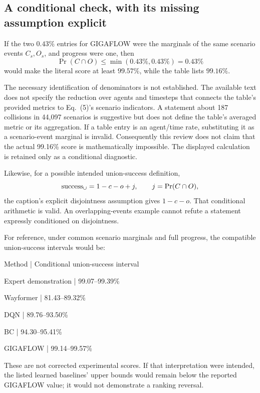 \documentclass[10pt]{article}
\begin{document}
\subsection*{A conditional check, with its missing assumption explicit}
If the two \(0.43\%\) entries for GIGAFLOW were the marginals of the same scenario events \(C_s,O_s\), and progress were one, then \[\Pr(C\cap O)\le\min(0.43\%,0.43\%)=0.43\%\] would make the literal score at least \(99.57\%\), while the table lists \(99.16\%\).\par
The necessary identification of denominators is not established. The available text does not specify the reduction over agents and timesteps that connects the table’s provided metrics to Eq. (5)’s scenario indicators. A statement about 187 collisions in 44,097 scenarios is suggestive but does not define the table’s averaged metric or its aggregation. If a table entry is an agent/time rate, substituting it as a scenario-event marginal is invalid. Consequently this review does not claim that the actual 99.16\% score is mathematically impossible. The displayed calculation is retained only as a conditional diagnostic.\par
Likewise, for a possible intended union-success definition, \[{\rm success}_{\cup}=1-c-o+j,\qquad j=\Pr(C\cap O),\] the caption’s explicit disjointness assumption gives \(1-c-o\). That conditional arithmetic is valid. An overlapping-events example cannot refute a statement expressly conditioned on disjointness.\par
For reference, under common scenario marginals and full progress, the compatible union-success intervals would be:\par
Method | Conditional union-success interval\par
Expert demonstration | 99.07–99.39\%\par
Wayformer | 81.43–89.32\%\par
DQN | 89.76–93.50\%\par
BC | 94.30–95.41\%\par
GIGAFLOW | 99.14–99.57\%\par
These are not corrected experimental scores. If that interpretation were intended, the listed learned baselines’ upper bounds would remain below the reported GIGAFLOW value; it would not demonstrate a ranking reversal.\par
\end{document}
